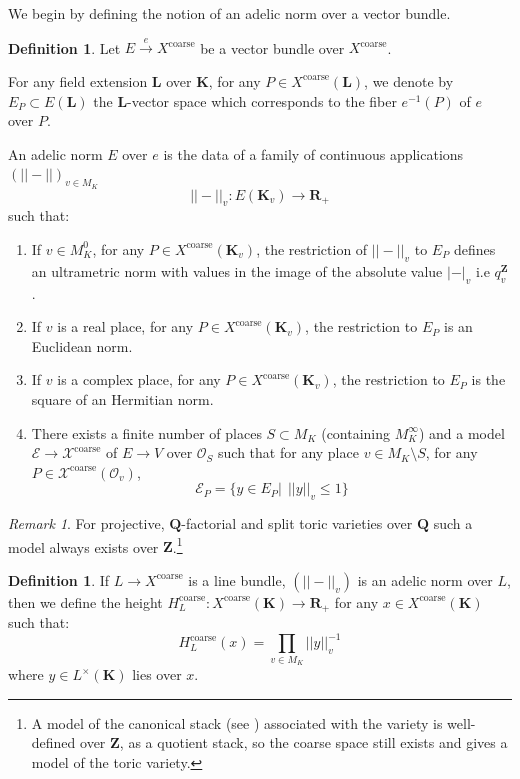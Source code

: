 \documentclass{proc-l}
\newcommand{\R}{\mathbf{R}}
\newcommand{\Z}{\mathbf{Z}}
\newcommand{\K}{\mathbf{K}}
\newcommand{\Q}{\mathbf{Q}}
\newcommand{\Le}{\mathbf{L}}
\DeclareMathOperator{\coarse}{coarse}
\newcommand{\sheafO}{\mathcal{O}}
\theoremstyle{definition}
\newtheorem{definition}[theorem]{Definition}
\theoremstyle{remark}
\newtheorem{remark}[theorem]{Remark}
\numberwithin{equation}{section}
\begin{document}
We begin by defining the notion of an adelic norm over a vector bundle.

\begin{definition}
    Let $E \xrightarrow{e} X^{\coarse}$ be a vector bundle over $X^{\coarse}$.

   For any field extension $\Le$ over $\K$, for any $P \in X^{\coarse}(\Le)$, we denote by $E_P \subset E(\Le)$ the $\Le$-vector space which corresponds to the fiber $e^{-1}(P)$ of $e$ over $P$.
   
   An adelic norm $E$ over $e$ is the data of a family of continuous applications $(||-|| )_{v \in M_K}$ 
   $$ ||-||_v : E(\K_v) \rightarrow \R_+$$
   such that:
\begin{enumerate}
    \item If $v \in M_K^0$, for any $P \in X^{\coarse}(\K_v)$, the restriction of $||-||_v$ to $E_P$ defines an ultrametric norm with values in the image of the absolute value $|-|_v$ i.e $q_v^{\Z}$.

    \item If $v$ is a real place, for any $P \in X^{\coarse}(\K_v)$, the restriction to $E_P$ is an Euclidean norm.

    \item If $v$ is a complex place, for any $P \in X^{\coarse}(\K_v)$, the restriction to $E_P$ is the square of an Hermitian norm.

    \item There exists a finite number of places $S \subset M_K$ (containing $M_K^{\infty}$) and a model $\mathcal{E} \rightarrow \mathcal{X}^{\coarse}$ of $E \rightarrow V$ over $\sheafO_S$ such that for any place $v \in M_K \setminus S$, for any $P \in \mathcal{X}^{\coarse}(\sheafO_v)$,
    $$ \mathcal{E}_P = \{ y \in E_P | \ \ ||y||_v \leqslant 1 \}$$
    
\end{enumerate}

\end{definition}

\begin{remark}
    For projective, $\Q$-factorial and split toric varieties over $\Q$ such a model always exists over $\Z$.\footnote{A model of the canonical stack (see \cite[Definition 4.4]{fantechi_toric_stack}) associated with the variety is well-defined over $\Z$, as a quotient stack, so the coarse space still exists and gives a model of the toric variety.}
\end{remark}


\begin{definition}
    If $L \rightarrow X^{\coarse}$ is a line bundle, $\left( ||-||_v \right)$ is an adelic norm over $L$, then we define the height $H^{\coarse}_L : X^{\coarse}(\K) \rightarrow \R_+$ for any $x \in X^{\coarse}(\K)$ such that:
    $$H^{\coarse}_L(x) = \prod\limits_{v \in M_K} ||y||_v^{-1}$$where $y \in L^{\times}(\K)$ lies over $x$.
\end{definition}
\end{document}
